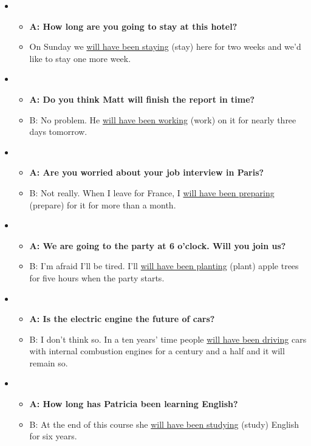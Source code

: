 \begin{itemize}

\item
\begin{itemize}
\item\textbf{A: How long are you going to stay at this hotel?}
\item On Sunday we \underline{will have been staying} (stay) here for two weeks and we'd like to stay one more week.   
\end{itemize}

\item
\begin{itemize}
\item\textbf{A: Do you think Matt will finish the report in time?}
\item B: No problem. He \underline{will have been working} (work) on it for nearly three days tomorrow.
\end{itemize}

\item
\begin{itemize}
\item\textbf{A: Are you worried about your job interview in Paris?}
\item B: Not really. When I leave for France, I \underline{will have been preparing} (prepare) for it for more than a month.  
\end{itemize}

\item
\begin{itemize}
\item\textbf{A: We are going to the party at 6 o'clock. Will you join us?}
\item B: I'm afraid I'll be tired. I'll \underline{will have been planting} (plant) apple trees for five hours when the party starts.
\end{itemize}

\item
\begin{itemize}
\item\textbf{A: Is the electric engine the future of cars?}
\item B: I don't think so. In a ten years' time people \underline{will have been driving} cars with internal combustion engines for a century and a half and it will remain so.
\end{itemize}

\item
\begin{itemize}
\item\textbf{A: How long has Patricia been learning English?}
\item B: At the end of this course she \underline{will have been studying}  (study) English for six years. 
\end{itemize}


\end{itemize}
